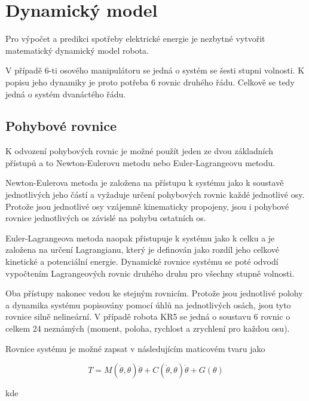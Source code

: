 

\chapter{Dynamický model}

Pro výpočet a predikci spotřeby elektrické energie je nezbytné vytvořit matematický dynamický model robota. 

V případě 6-ti osového manipulátoru se jedná o systém se šesti stupni volnosti. K popisu jeho dynamiky je proto potřeba 6 rovnic druhého řádu. Celkově se tedy jedná o systém dvanáctého řádu. 

\section{Pohybové rovnice}
\label{pohybove_rovnice_sec}
K odvození pohybových rovnic je možné použít jeden ze dvou základních přístupů a to Newton-Eulerovu metodu nebo Euler-Lagrangeovu metodu. 

Newton-Eulerova metoda je založena na přístupu k systému jako k soustavě jednotlivých jeho částí a vyžaduje určení pohybových rovnic každé jednotlivé osy. Protože jsou jednotlivé osy vzájemně kinematicky propojeny, jsou i pohybové rovnice jednotlivých os závislé na pohybu ostatních os. 

Euler-Lagrangeova metoda naopak přistupuje k systému jako k celku a je založena na určení Lagrangianu, který je definován jako rozdíl jeho celkové kinetické a potenciální energie. Dynamické rovnice systému se poté odvodí vypočtením Lagrangeových rovnic druhého druhu pro všechny stupně volnosti.

Oba přístupy nakonec vedou ke stejným rovnicím. Protože jsou jednotlivé polohy a dynamika systému popisovány pomocí úhlů na jednotlivých osách, jsou tyto rovnice silně nelineární. V případě robota KR5 se jedná o soustavu 6 rovnic o celkem 24 neznámých (moment, poloha, rychlost a zrychlení pro každou osu). 

Rovnice systému je možné zapsat v následujícím maticovém tvaru jako 

\begin{equation}
T = M(\dot{\theta},\theta)\ddot{\theta} + C(\dot{\theta},\theta)\dot{\theta} + G(\theta)
\label{dyn_rovnice_eq}
\end{equation}

kde

